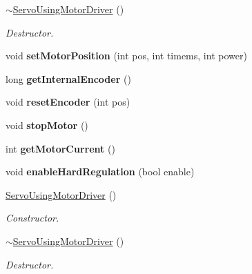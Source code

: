 \begin{DoxyCompactItemize}
\hyperlink{classServoUsingMotorDriver_a8aa604a17555514d3ddf78e15f467faf}{$\sim$\+Servo\+Using\+Motor\+Driver} ()
\begin{DoxyCompactList}\small\item\em Destructor. \end{DoxyCompactList}\item 
\mbox{\label{classServoUsingMotorDriver_a9569643c48ac9d6c1936e8562825e280}} 
void {\bfseries set\+Motor\+Position} (int pos, int timems, int power)
\item 
\mbox{\label{classServoUsingMotorDriver_a64c62fd0ecb287fe45770c387e394eac}} 
long {\bfseries get\+Internal\+Encoder} ()
\item 
\mbox{\label{classServoUsingMotorDriver_acf78dbe83df0a7744fd40920a6388efd}} 
void {\bfseries reset\+Encoder} (int pos)
\item 
\mbox{\label{classServoUsingMotorDriver_a58fbf805d7bb382b505ea634e6bcbb08}} 
void {\bfseries stop\+Motor} ()
\item 
\mbox{\label{classServoUsingMotorDriver_ad76b35929d55c4249c5e7c3818c053b6}} 
int {\bfseries get\+Motor\+Current} ()
\item 
\mbox{\label{classServoUsingMotorDriver_adeb6e60d59bac919b7dc45c6f4a4f32c}} 
void {\bfseries enable\+Hard\+Regulation} (bool enable)
\item 
\mbox{\label{classServoUsingMotorDriver_acc8ccf92143efa853b83940d2d690817}} 
\hyperlink{classServoUsingMotorDriver_acc8ccf92143efa853b83940d2d690817}{Servo\+Using\+Motor\+Driver} ()
\begin{DoxyCompactList}\small\item\em Constructor. \end{DoxyCompactList}\item 
\mbox{\label{classServoUsingMotorDriver_a8aa604a17555514d3ddf78e15f467faf}} 
\hyperlink{classServoUsingMotorDriver_a8aa604a17555514d3ddf78e15f467faf}{$\sim$\+Servo\+Using\+Motor\+Driver} ()
\begin{DoxyCompactList}\small\item\em Destructor. \end{DoxyCompactList}\item 

\end{DoxyCompactItemize}
